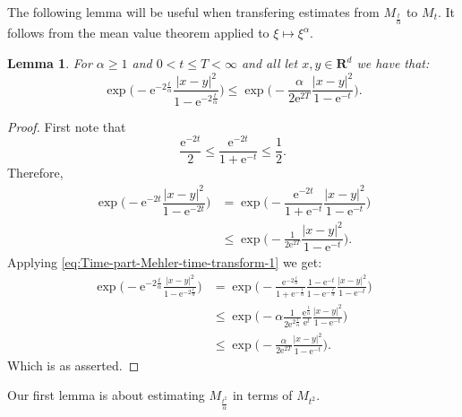 \documentclass[a4paper,oneside,10pt]{amsproc}
\theoremstyle{plain}
\newtheorem{lemma}{Lemma}
\theoremstyle{remark}
\renewcommand{\leq}{\leqslant}
\renewcommand{\leq}{\leqslant}
\renewcommand{\geq}{\geqslant}
\newcommand{\R}{\mathbf R}
\newcommand{\e}{\mathrm{e}} %
\renewcommand{\leq}{\leqslant}%
\renewcommand{\geq}{\geqslant}%
\begin{document}
The following lemma will be useful when transfering estimates from
$M_{\frac{t}{\alpha}}$ to $M_t$. It follows from the mean value
theorem applied to $\xi \mapsto \xi^\alpha$.
\begin{lemma}\label{lem:Exponential-estimates}
  For $\alpha \geq 1$ and $0 < t \leq T < \infty$ and all let $x, y \in \R^d$
  we have that:
  \begin{equation}
    \label{eq:Exponential-estimates-1}
    \exp \biggl (-\e^{-2\frac{t}\alpha} \frac{|x - y|^2}{1 - \e^{-2\frac{t}\alpha}}
    \biggr ) \leq \exp \biggl(-\frac{\alpha}{2\e^{2T}} \frac{|x -
      y|^2}{1 - \e^{-t}} \biggr).
  \end{equation}
\end{lemma}
\begin{proof}
First note that
\begin{equation*}
  \frac{\e^{-2t}}2 \leq \frac{\e^{-2t}}{1 + \e^{-t}} \leq \frac12.
\end{equation*}
Therefore,
\begin{align*}
 \exp\biggl(-\e^{-2t} \dfrac{|x - y|^2}{1 - \e^{-2 t}} \biggr)
 &= \exp\biggl(-\dfrac{\e^{-2t}}{1 + \e^{-t}} \dfrac{|x -
   y|^2}{1 - \e^{-t}} \biggr)\\
 &\leq \exp\biggl(-\frac1{2\e^{2T}} \dfrac{|x - y|^2}{1 - \e^{-t}} \biggr).
\end{align*}
Applying \eqref{eq:Time-part-Mehler-time-transform-1} we get:
\begin{align*}
  \exp \biggl (-\e^{-2\frac{t}\alpha} \frac{|x - y|^2}{1 - \e^{-2\frac{t}\alpha}}
  \biggr ) &= \exp \biggl (-\frac{\e^{-2\frac{t}\alpha}}{1 + \e^{-\frac{t}\alpha}} \frac{1 - \e^{-t}}{1 -
    \e^{-\frac{t}\alpha}}  \frac{|x - y|^2}{1 - \e^{-t}} \biggr )\\
  &\leq \exp \biggl(-\alpha \frac{1}{2\e^{2\frac{t}{\alpha}}}
  \frac{\e^{\frac{t}\alpha}}{\e^t} \frac{|x - y|^2}{1 - \e^{-t}} \biggr)\\
  &\leq \exp \biggl(-\frac{\alpha}{2\e^{2T}} \frac{|x - y|^2}{1 - \e^{-t}} \biggr).
\end{align*}
Which is as asserted.
\end{proof}
Our first lemma is about estimating $M_{\frac{t^2}\alpha}$ in terms of
$M_{t^2}$.
\end{document}
